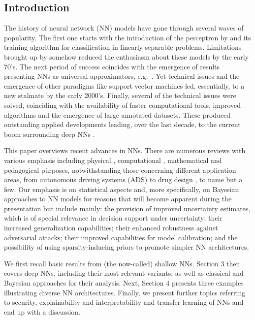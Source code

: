 
\subsection{Introduction}

The history of neural network (NN) models have gone 
through several waves of popularity. The first 
one starts with the introduction of the perceptron
by \cite{rosenblatt1958perceptron} and its training algorithm 
for classification in linearly separable problems.
Limitations brought up by 
\cite{minsky} somehow reduced the enthusiasm
about these models by the early 70's.
The next period of success coincides with the emergence
of results presenting NNs as universal
approximators, e.g.\ \cite{cybenko1989approximation}. Yet 
technical issues and the emergence of other paradigms like 
support vector machines led, essentially,
to a new stalmate by the early 2000's. Finally, several of the 
technical issues were solved, coinciding with the 
availability of faster computational tools,
improved algorithms and the emergence of
large annotated datasets. These produced outstanding 
applied developments leading, over the last decade, to the current boom 
surrounding deep NNs \cite{deeplearningbook}. 

This paper overviews  
recent advances in NNs. 
There are numerous reviews with various emphasis 
including physical \cite{cirac}, computational \cite{chollet}, mathematical \cite{maths} and pedagogical \cite{teach} pùrposes, 
notwithstanding  those concerning different  application areas, 
from autonomous driving systems (ADS) \cite{rumanos} to
drug design \cite{hessler}, to name but a few. 
Our emphasis is on statistical
aspects and, more specifically, on Bayesian approaches
to NN models for reasons that will become 
apparent during the presentation but include mainly:
the provision of improved uncertainty estimates, which is
of special relevance in decision support under uncertainty; their 
increased generalization capabilities; their 
enhanced robustness against adversarial attacks; 
their improved capabilities for model calibration;
and the possibility of using sparsity-inducing priors
to promote simpler NN architectures.

We first recall basic results from (the now-called) 
shallow NNs.
Section 3 then covers deep NNs, including their most
relevant 
variants, as well as classical and Bayesian approaches
for their analysis. Next, Section 4
presents three examples illustrating
diverse NN architectures. Finally, we present 
further topics referring to security, explainability and
interpretability and transfer 
learning of NNs and end up with a discussion.

